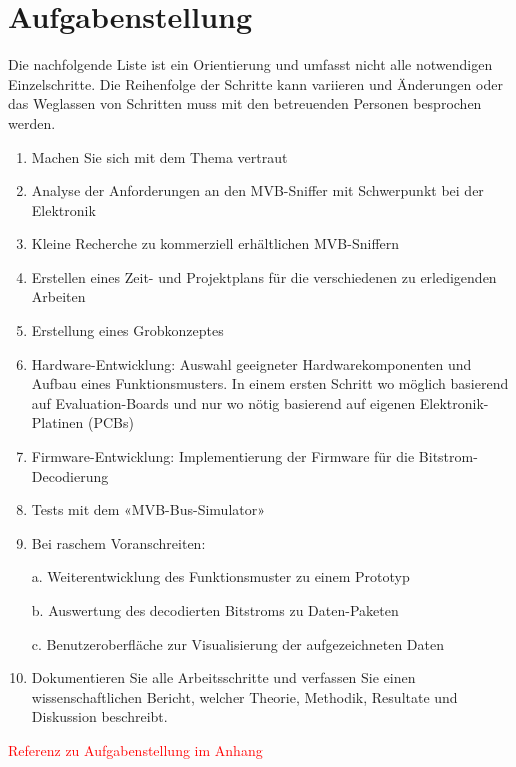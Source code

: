 \section{Aufgabenstellung}
\label{Aufgabenstellung} %

Die nachfolgende Liste ist ein Orientierung und umfasst nicht alle notwendigen Einzelschritte. Die Reihenfolge der Schritte kann variieren und Änderungen oder das Weglassen von Schritten muss mit den betreuenden Personen besprochen werden. 
 \begin{enumerate}
     \item Machen Sie sich mit dem Thema vertraut
     \item Analyse der Anforderungen an den MVB-Sniffer mit Schwerpunkt bei der Elektronik 
     \item Kleine Recherche zu kommerziell erhältlichen MVB-Sniffern
     \item Erstellen eines Zeit- und Projektplans für die verschiedenen zu erledigenden Arbeiten
     \item Erstellung eines Grobkonzeptes
     \item Hardware-Entwicklung: Auswahl geeigneter Hardwarekomponenten und Aufbau eines 
     Funktionsmusters. In einem ersten Schritt wo möglich basierend auf Evaluation-Boards und nur wo 
     nötig basierend auf eigenen Elektronik-Platinen (PCBs)
     \item Firmware-Entwicklung: Implementierung der Firmware für die Bitstrom-Decodierung
     \item Tests mit dem «MVB-Bus-Simulator»
     \item Bei raschem Voranschreiten: 
     
a. Weiterentwicklung des Funktionsmuster zu einem Prototyp 

b. Auswertung des decodierten Bitstroms zu Daten-Paketen 

c. Benutzeroberfläche zur Visualisierung der aufgezeichneten Daten 
     \item Dokumentieren Sie alle Arbeitsschritte und verfassen Sie einen wissenschaftlichen Bericht, welcher Theorie, Methodik, Resultate und Diskussion beschreibt.
     \end{enumerate}

\textcolor{red}{Referenz zu Aufgabenstellung im Anhang}


